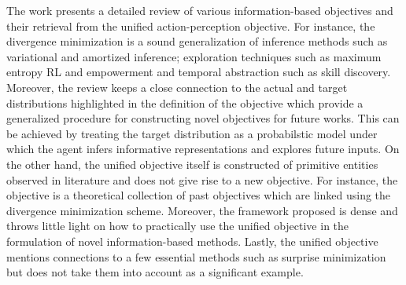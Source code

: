 \documentclass[11pt,letterpaper]{article}
\begin{document}
The work presents a detailed review of various information-based objectives and their retrieval from the unified action-perception objective. For instance, the divergence minimization is a sound generalization of inference methods such as variational and amortized inference; exploration techniques such as maximum entropy RL and empowerment and temporal abstraction such as skill discovery. Moreover, the review keeps a close connection to the actual and target distributions highlighted in the definition of the objective which provide a generalized procedure for constructing novel objectives for future works. This can be achieved by treating the target distribution as a probabilstic model under which the agent infers informative representations and explores future inputs. On the other hand, the unified objective itself is constructed of primitive entities observed in literature and does not give rise to a new objective. For instance, the objective is a theoretical collection of past objectives which are linked using the divergence minimization scheme. Moreover, the framework proposed is dense and throws little light on how to practically use the unified objective in the formulation of novel information-based methods. Lastly, the unified objective mentions connections to a few essential methods such as surprise minimization but does not take them into account as a significant example.
\end{document}
